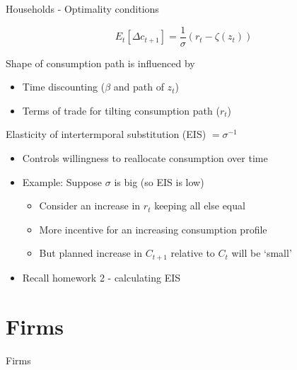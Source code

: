 

\begin{frame}{Households - Optimality conditions}

\[
E_{t} \left[ \Delta c_{t+1} \right]  = \frac{1}{\sigma} \left( r_{t} - \zeta\left(z_{t}\right) \right)
\]

Shape of consumption path is influenced by
\begin{itemize}
\item	Time discounting ($\beta$ and path of $z_{t}$)
\item	Terms of trade for tilting consumption path ($r_{t}$)
\end{itemize}

\vspace{2mm}
Elasticity of intertermporal substitution (EIS) $=\sigma^{-1}$
\begin{itemize}
\item	Controls willingness to reallocate consumption over time
\item	Example: Suppose $\sigma$ is big (so EIS is low)
	\begin{itemize}
	\item 	Consider an increase in $r_{t}$ keeping all else equal
	\item	More incentive for an increasing consumption profile
	\item	But planned increase in $C_{t+1}$ relative to $C_{t}$ will be `small'
	\end{itemize}
\item	Recall homework 2 - calculating EIS
\end{itemize}

\end{frame}

\section{Firms}

\begin{frame}

\begin{center}
{\LARGE Firms}
\end{center}

\end{frame}

